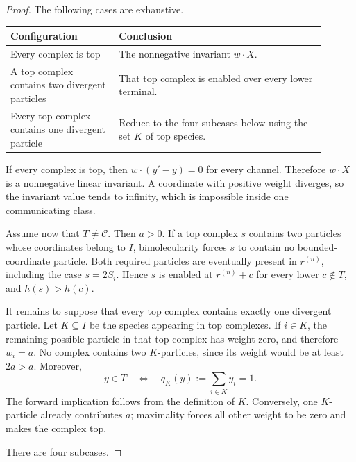 \begin{proof}
The following cases are exhaustive.

\begin{center}
\begin{tabular}{p{0.31\linewidth}p{0.59\linewidth}}
\toprule
Configuration & Conclusion \\
\midrule
Every complex is top & The nonnegative invariant \(w\cdot X\). \\
A top complex contains two divergent particles & That top complex is enabled over every lower terminal. \\
Every top complex contains one divergent particle & Reduce to the four subcases below using the set \(K\) of top species. \\
\bottomrule
\end{tabular}
\end{center}

If every complex is top, then \(w\cdot(y'-y)=0\) for every channel.
Therefore \(w\cdot X\) is a nonnegative linear invariant.  A coordinate with
positive weight diverges, so the invariant value tends to infinity, which is
impossible inside one communicating class.

Assume now that \(T\ne\mathcal C\).  Then \(a>0\).  If a top complex \(s\)
contains two particles whose coordinates belong to \(I\), bimolecularity
forces \(s\) to contain no bounded-coordinate particle.  Both required
particles are eventually present in \(r^{(n)}\), including the case
\(s=2S_i\).  Hence \(s\) is enabled at \(r^{(n)}+c\) for every lower
\(c\notin T\), and \(h(s)>h(c)\).

It remains to suppose that every top complex contains exactly one divergent
particle.  Let \(K\subseteq I\) be the species appearing in top complexes.
If \(i\in K\), the remaining possible particle in that top complex has
weight zero, and therefore \(w_i=a\).  No complex contains two
\(K\)-particles, since its weight would be at least \(2a>a\).  Moreover,
\begin{equation}\label{eq:top-iff}
  y\in T\quad\Longleftrightarrow\quad
  q_K(y):=\sum_{i\in K}y_i=1.
\end{equation}
The forward implication follows from the definition of \(K\).  Conversely,
one \(K\)-particle already contributes \(a\); maximality forces all other
weight to be zero and makes the complex top.

There are four subcases.


\end{proof}
